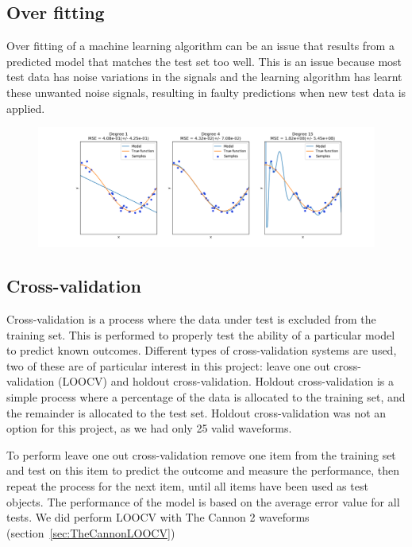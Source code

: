 \subsection{Over fitting}
Over fitting of a machine learning algorithm can be an issue that results from a predicted model that matches the test set too well. This is an issue because most test data has noise variations in the signals and the learning algorithm has learnt these unwanted noise signals, resulting in faulty predictions when new test data is applied. 
\begin{figure}[H]
	\centering
	\includegraphics[width=15cm]{./img/Overfitting.png} 
	\caption[\protect]{\protect}%
	\label{fig:Overfitting}
\end{figure}

\subsection{Cross-validation}
\label{sec:CrossValidation}
Cross-validation is a process where the data under test is excluded from the training set. This is performed to properly test the ability of a particular model to predict known outcomes. Different types of cross-validation systems are used, two of these are of particular interest in this project: leave one out cross-validation (LOOCV) and holdout cross-validation. Holdout cross-validation is a simple process where a percentage of the data is allocated to the training set, and the remainder is allocated to the test set. Holdout cross-validation was not an option for this project, as we had only 25 valid waveforms. \par
To perform leave one out cross-validation remove one item from the training set and test on this item to predict the outcome and measure the performance, then repeat the process for the next item, until all items have been used as test objects. The performance of the model is based on the average error value for all tests. 
We did perform LOOCV with The Cannon 2 waveforms (section~\ref{sec:TheCannonLOOCV})

